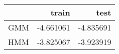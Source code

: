\begin{tabular}{lrr}
\toprule
{} &     train &      test \\
\midrule
GMM & -4.661061 & -4.835691 \\
HMM & -3.825067 & -3.923919 \\
\bottomrule
\end{tabular}

